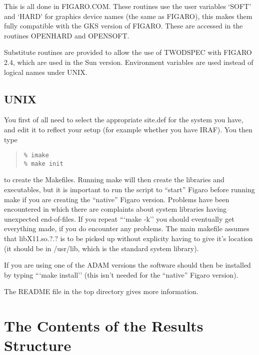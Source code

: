 This is all done in FIGARO.COM. These routines use the user variables
`SOFT' and `HARD' for graphics device names (the same as FIGARO),
this makes them fully compatible with the GKS version of FIGARO.
These are accessed in the routines OPENHARD and OPENSOFT.

Substitute routines are provided to allow the use of TWODSPEC with
FIGARO 2.4, which are used in the Sun version. Environment variables
are used instead of logical names under UNIX.

\subsection{UNIX}

You first of all need to select the appropriate site.def for the system
you have, and edit it to reflect your setup (for example whether you have
IRAF). You then type
\begin{quote}\begin{verbatim}
% imake
% make init
\end{verbatim}\end{quote}
to create the Makefiles.
Running make will then create the libraries and executables, but it is
important to run the script to ``start'' Figaro before running make if you are
creating the ``native'' Figaro version.
Problems have been encountered in which there are complaints about system
libraries having unexpected end-of-files. If you repeat ```make -k''
you should eventually get everything made, if you do encounter any problems.
The main makefile assumes that libX11.so.?.? is to be picked up without
explicity having to give it's location (it should be in /usr/lib, which is the
standard system library).

If you are using one of the ADAM versions the software should then be
installed by typing ```make install'' (this isn't needed for the ``native''
Figaro version).

The README file in the top directory gives more information.

\section{The Contents of the Results Structure}
\label{ap.res}

